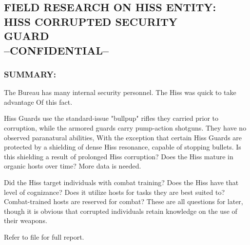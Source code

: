 \subsection*{FIELD RESEARCH ON HISS ENTITY:\\
	HISS CORRUPTED SECURITY\\
	GUARD\\
	--CONFIDENTIAL--}
\subsubsection*{SUMMARY:}
\par The Bureau has many internal security
personnel. The Hiss was quick to take
advantage Of this fact.
\par Hiss Guards use the standard-issue
"bullpup" rifles they carried prior to corruption, while the armored
guards carry pump-action shotguns. They have no observed
paranatural abilities, With the exception that certain Hiss Guards
are protected by a shielding of dense Hiss resonance, capable of
stopping bullets. Is this shielding a result of prolonged Hiss
corruption? Does the Hiss mature in organic hosts over time?
More data is needed.
\par Did the Hiss target individuals with combat training? Does the
Hiss have that level of cognizance? Does it utilize hosts for tasks
they are best suited to? Combat-trained hosts are reserved for
combat? These are all questions for later, though it is obvious that
corrupted individuals retain knowledge on the use of their
weapons.
\par Refer to file  for full report.